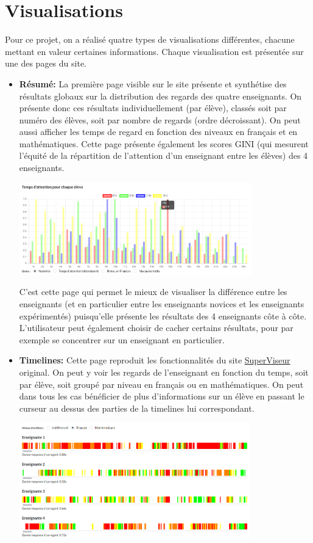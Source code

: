 \documentclass{article}
\begin{document}
\section{Visualisations}
Pour ce projet, on a réalisé quatre types de visualisations différentes, chacune mettant en valeur certaines informations. Chaque visualisation est présentée sur une des pages du site.
\begin{itemize}
    \item \textbf{Résumé:} La première page visible sur le site présente et synthétise des résultats globaux sur la distribution des regards des quatre enseignants. On présente donc ces résultats individuellement (par élève), classés soit par numéro des élèves, soit par nombre de regards (ordre décroissant). On peut aussi afficher les temps de regard en fonction des niveaux en français et en mathématiques. Cette page présente également les scores GINI (qui mesurent l'équité de la répartition de l'attention d'un enseignant entre les élèves) des 4 enseignants. 
        \begin{center}
            \includegraphics[height=4cm]{resume.png}
        \end{center}
        C'est cette page qui permet le mieux de visualiser la différence entre les enseignants (et en particulier entre les enseignants novices et les enseignants expérimentés) puisqu'elle présente les résultats des 4 enseignants côte à côte. L'utilisateur peut également choisir de cacher certains résultats, pour par exemple se concentrer sur un enseignant en particulier.\\
    \item \textbf{Timelines:} Cette page reproduit les fonctionnalités du site \href{http://superviseur.lip6.fr/}{SuperViseur} original. On peut y voir les regards de l'enseignant en fonction du temps, soit par élève, soit groupé par niveau en français ou en mathématiques. On peut dans tous les cas bénéficier de plus d'informations sur un élève en passant le curseur au dessus des parties de la timelines lui correspondant. 
        \begin{center}
            \includegraphics[height=5cm]{timelines.png}

\end{center}
\end{itemize}
\end{document}
